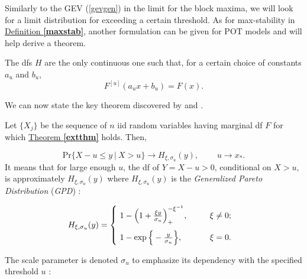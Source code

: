 Similarly to the GEV (\ref{gevgen}) in the limit for the block maxima, we will look for a limit distribution for exceeding a certain threshold. As for max-stability in \hyperref[maxstab]{Definition \textbf{\ref{maxstab}}}, another formulation can be given for POT models and will help derive a theorem.

\begin{definition}%
	The dfs $H$ are the only continuous one such that, for a certain choice of constants $a_u$ and $b_u$, 
	\begin{equation*}
	F^{[u]}(a_ux+b_u)=F(x).
	\end{equation*}
\end{definition}
We can now state the key theorem discovered by \citet{balkema_residual_1974} and \citet{iii_statistical_1975-1}.

\begin{theorem}\label{thm:gpd}
	Let $\{X_j\}$ be the sequence of $n$ iid random variables having marginal df $F$ for which \hyperref[extthm]{Theorem \textbf{\ref{extthm}}} holds. Then,

	\begin{equation} \label{gpdconv}
	\text{Pr}\big\{X-u\leq y\ |\ X>u\big\}\longrightarrow H_{\xi,\sigma_u}(y), \ \ \ \ \ \ \ \ \ \ u\to x_*.
	\end{equation}
	It means that for large enough $u$, the df of  $Y=X-u>0$, conditional on $X>u$, is approximately $H_{\xi,\sigma_u}(y)$ where $H_{\xi,\sigma_u}(y)$ is the \emph{Generalized Pareto Distribution} (\emph{GPD}) :
	
	\begin{equation}\label{gpdeq}
	H_{\xi,\sigma_u}(y)=
	\renewcommand{\arraystretch}{0.6}\left\{\begin{array}{@{}l@{\quad}l@{}}
	\ 1-\Big(1+\frac{\xi y}{\sigma_u}\Big)_+^{-\xi^{-1}}, \ \ \ \ \ \  \ \ \xi\neq 0; \\ 
	\vspace{0.0002cm} \\
	\ 1-\exp\Big\{-\frac{y}{\sigma_u}\Big\}, \ \ \ \ \ \ \ \ \ \ \xi=0.
	
	\end{array}\right.\kern-\nulldelimiterspace
	\end{equation}
	
\end{theorem}
The scale parameter is denoted $\sigma_u$ to emphasize its dependency with the specified threshold $u$ :

